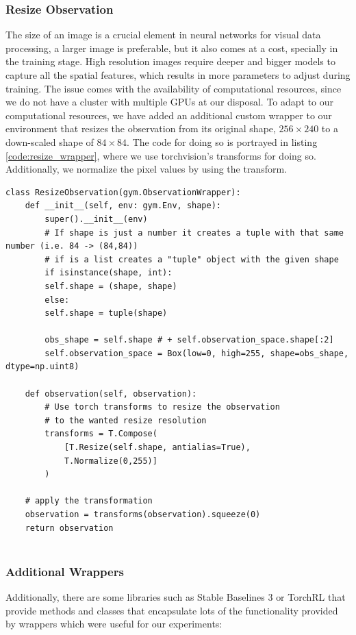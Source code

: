 \subsubsection{Resize Observation}
The size of an image is a crucial element in neural networks for visual data processing, a larger image is preferable, but it also comes at a cost, specially in the training stage. High resolution images require deeper and bigger models to capture all the spatial features, which results in more parameters to adjust during training. The issue comes with the availability of computational resources, since we do not have a cluster with multiple GPUs at our disposal. To adapt to our computational resources, we have added an additional custom wrapper to our environment that resizes the observation from its original shape, $256 \times 240$ to a down-scaled shape of $84 \times 84$. The code for doing so is portrayed in listing \ref{code:resize_wrapper}, where we use torchvision's transforms for doing so. Additionally, we normalize the pixel values by using the  transform.

\begin{lstlisting}[caption={Resize frame wrapper}, label={code:resize_wrapper}]
class ResizeObservation(gym.ObservationWrapper):
	def __init__(self, env: gym.Env, shape):
		super().__init__(env)
		# If shape is just a number it creates a tuple with that same number (i.e. 84 -> (84,84))
		# if is a list creates a "tuple" object with the given shape
		if isinstance(shape, int):
		self.shape = (shape, shape)
		else:
		self.shape = tuple(shape)
		
		obs_shape = self.shape # + self.observation_space.shape[:2]
		self.observation_space = Box(low=0, high=255, shape=obs_shape, dtype=np.uint8)
	
	def observation(self, observation):
		# Use torch transforms to resize the observation 
		# to the wanted resize resolution
		transforms = T.Compose(
			[T.Resize(self.shape, antialias=True),
			T.Normalize(0,255)]
		)
		
	# apply the transformation
	observation = transforms(observation).squeeze(0)
	return observation
	
\end{lstlisting}

\subsubsection{Additional Wrappers}
Additionally, there are some libraries such as Stable Baselines 3 \cite{stable-baselines3} or TorchRL \cite{bou2023torchrl} that provide methods and classes that encapsulate lots of the functionality provided by wrappers which were useful for our experiments:

